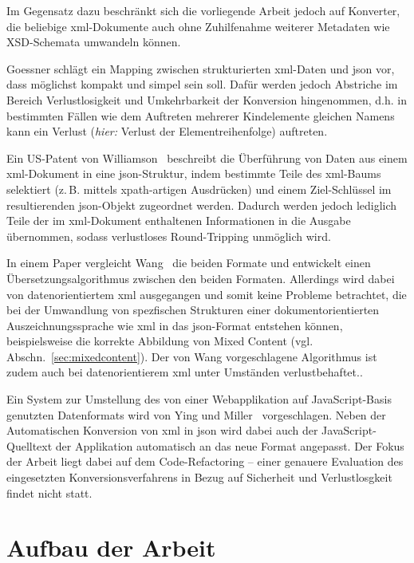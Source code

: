Im Gegensatz dazu beschränkt sich die vorliegende Arbeit jedoch auf Konverter, die beliebige \acrshort{xml}-Dokumente auch ohne Zuhilfenahme weiterer Metadaten wie XSD-Schemata umwandeln können.

Goessner schlägt ein Mapping zwischen strukturierten \acrshort{xml}-Daten und \acrshort{json} vor, dass möglichst kompakt und simpel sein soll. Dafür werden jedoch Abstriche im Bereich Verlustlosigkeit und Umkehrbarkeit der Konversion hingenommen, d.h. in bestimmten Fällen wie dem Auftreten mehrerer Kindelemente gleichen Namens kann ein Verlust (\emph{hier:} Verlust der Elementreihenfolge) auftreten.~\cite{goessner2006converting}

Ein US-Patent von Williamson~\cite{US20140244692} beschreibt die Überführung von Daten aus einem \acrshort{xml}-Dokument in eine \acrshort{json}-Struktur, indem bestimmte Teile des \acrshort{xml}-Baums selektiert (z.\,B. mittels \acrshort{xpath}-artigen Ausdrücken) und einem Ziel-Schlüssel im resultierenden \acrshort{json}-Objekt zugeordnet werden. Dadurch werden jedoch lediglich Teile der im \acrshort{xml}-Dokument enthaltenen Informationen in die Ausgabe übernommen, sodass verlustloses Round-Tripping unmöglich wird.

In einem Paper vergleicht Wang~\cite{wang2011improving} die beiden Formate und entwickelt einen Übersetzungsalgorithmus zwischen den beiden Formaten. Allerdings wird dabei von datenorientiertem \acrshort{xml} ausgegangen und somit keine Probleme betrachtet, die bei der Umwandlung von spezfischen Strukturen einer dokumentorientierten Auszeichnungssprache wie \acrshort{xml} in das \acrshort{json}-Format entstehen können, beispielsweise die korrekte Abbildung von Mixed Content (vgl. Abschn.~\ref{sec:mixedcontent}). Der von Wang vorgeschlagene Algorithmus ist zudem auch bei datenorientierem \acrshort{xml} unter Umständen verlustbehaftet.\cite[S.~184]{wang2011improving}.

Ein System zur Umstellung des von einer Webapplikation auf JavaScript-Basis genutzten Datenformats wird von Ying und Miller~\cite{ying2013refactoring} vorgeschlagen. Neben der Automatischen Konversion von \acrshort{xml} in \acrshort{json} wird dabei auch der JavaScript-Quelltext der Applikation automatisch an das neue Format angepasst. Der Fokus der Arbeit liegt dabei auf dem Code-Refactoring -- einer genauere Evaluation des eingesetzten Konversionsverfahrens in Bezug auf Sicherheit und Verlustlosgkeit findet nicht statt.

\section{Aufbau der Arbeit}
\label{sec:structure}

